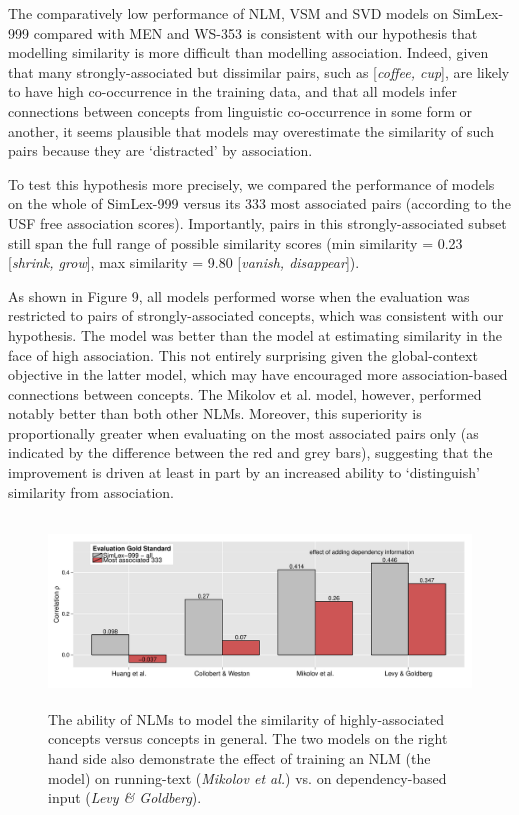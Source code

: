 \documentclass[fullname]{clv2}
\begin{document}
The comparatively low performance of NLM, VSM and SVD models on SimLex-999 compared with MEN and WS-353 is consistent with our hypothesis that modelling similarity is more difficult than modelling association. Indeed, given that many strongly-associated but dissimilar pairs, such as [\emph{coffee, cup}], are likely to have high co-occurrence in the training data, and that all models infer connections between concepts from linguistic co-occurrence in some form or another, it seems plausible that models may overestimate the similarity of such pairs because they are `distracted' by association.

To test this hypothesis more precisely, we compared the performance of models on the whole of SimLex-999 versus its 333 most associated pairs (according to the USF free association scores). Importantly, pairs in this strongly-associated subset still span the full range of possible similarity scores (min similarity = 0.23 [\emph{shrink, grow}], max similarity = 9.80 [\emph{vanish, disappear}]).     

As shown in Figure 9, all models performed worse when the evaluation was restricted to pairs of strongly-associated concepts, which was consistent with our hypothesis. The  model was better than the  model at estimating similarity in the face of high association. This not entirely surprising given the global-context objective in the latter model, which may have encouraged more association-based connections between concepts. The Mikolov et al. model, however, performed notably better than both other NLMs. Moreover, this superiority is proportionally greater when evaluating on the most associated pairs only (as indicated by the difference between the red and grey bars), suggesting that the improvement is driven at least in part by an increased ability to `distinguish' similarity from association. 

\begin{figure}[]  \includegraphics[width = \textwidth,height=5cm]{Figure_3A_CL}  \caption{The ability of NLMs to model the similarity of highly-associated concepts versus concepts in general. The two models on the right hand side also demonstrate the effect of training an NLM (the \protect{} model) on running-text (\emph{Mikolov et al.}) vs. on dependency-based input (\emph{Levy \& Goldberg}).}\end{figure}
\end{document}

